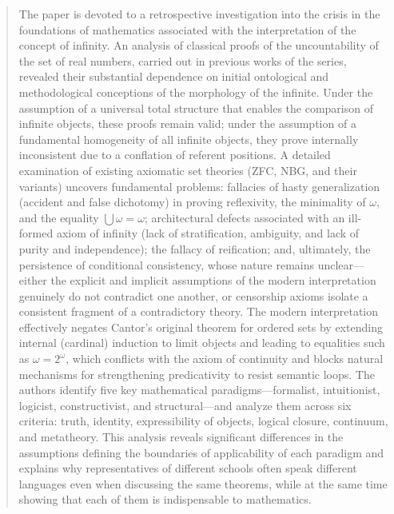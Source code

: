 \documentclass[12pt]{article}
\begin{document}

\begin{abstract}

The paper is devoted to a retrospective investigation into the crisis in the foundations of mathematics associated with the interpretation of the concept of infinity. An analysis of classical proofs of the uncountability of the set of real numbers, carried out in previous works of the series, revealed their substantial dependence on initial ontological and methodological conceptions of the morphology of the infinite. Under the assumption of a universal total structure that enables the comparison of infinite objects, these proofs remain valid; under the assumption of a fundamental homogeneity of all infinite objects, they prove internally inconsistent due to a conflation of referent positions. A detailed examination of existing axiomatic set theories (ZFC, NBG, and their variants) uncovers fundamental problems: fallacies of hasty generalization (accident and false dichotomy) in proving reflexivity, the minimality of $\omega$, and the equality $\bigcup \omega = \omega$; architectural defects associated with an ill-formed axiom of infinity (lack of stratification, ambiguity, and lack of purity and independence); the fallacy of reification; and, ultimately, the persistence of conditional consistency, whose nature remains unclear—either the explicit and implicit assumptions of the modern interpretation genuinely do not contradict one another, or censorship axioms isolate a consistent fragment of a contradictory theory. The modern interpretation effectively negates Cantor’s original theorem for ordered sets by extending internal (cardinal) induction to limit objects and leading to equalities such as $\omega = 2^\omega$, which conflicts with the axiom of continuity and blocks natural mechanisms for strengthening predicativity to resist semantic loops. The authors identify five key mathematical paradigms—formalist, intuitionist, logicist, constructivist, and structural—and analyze them across six criteria: truth, identity, expressibility of objects, logical closure, continuum, and metatheory. This analysis reveals significant differences in the assumptions defining the boundaries of applicability of each paradigm and explains why representatives of different schools often speak different languages even when discussing the same theorems, while at the same time showing that each of them is indispensable to mathematics.


\end{abstract}
\end{document}
